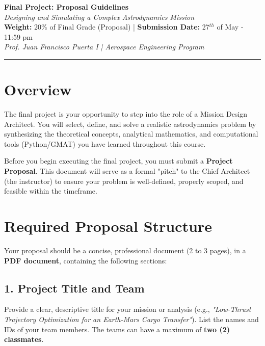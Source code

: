 \documentclass[11pt, letterpaper]{article}
\begin{document}
\begin{center}
    {\Large \textbf{Final Project: Proposal Guidelines}} \\
    \vspace{0.2cm}
    {\large \textit{Designing and Simulating a Complex Astrodynamics Mission}} \\
    \vspace{0.4cm}
    \textbf{Weight:} 20\% of Final Grade (Proposal) | \textbf{Submission Date:} 27$^{th}$ of May - 11:59 pm\\
    \textit{Prof. Juan Francisco Puerta I | Aerospace Engineering Program}
\end{center}

\hrule
\vspace{0.5cm}

\section*{Overview}
The final project is your opportunity to step into the role of a Mission Design Architect. You will select, define, and solve a realistic astrodynamics problem by synthesizing the theoretical concepts, analytical mathematics, and computational tools (Python/GMAT) you have learned throughout this course. 

Before you begin executing the final project, you must submit a \textbf{Project Proposal}. This document will serve as a formal "pitch" to the Chief Architect (the instructor) to ensure your problem is well-defined, properly scoped, and feasible within the timeframe.

\section*{Required Proposal Structure}
Your proposal should be a concise, professional document (2 to 3 pages), in a \textbf{PDF document}, containing the following sections:

\subsection*{1. Project Title and Team}
Provide a clear, descriptive title for your mission or analysis (e.g., \textit{"Low-Thrust Trajectory Optimization for an Earth-Mars Cargo Transfer"}). List the names and IDs of your team members. The teams can have a maximum of \textbf{two (2) classmates}.
\end{document}
